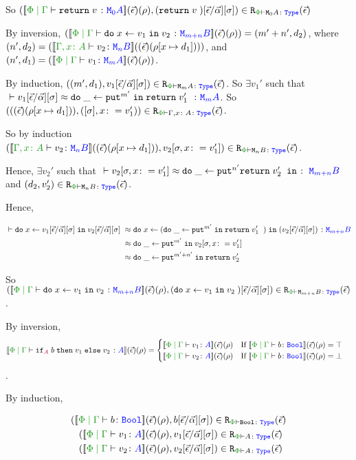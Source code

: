 \documentclass{Report}
\begin{document}
So $\inLogRelPE{\deno{\gpetyperelation{\return{v}}{\M{0}{A}}}\fundRho}{(\return{v})\fundSub}{\M{0}{A}}$

\case{\vbind}

By inversion, $(\deno{\gpetyperelation{\doin{x}{v_1}{v_2}}{\M{m+n}{B}}}\fundRho) = (m'+n', d_2)$, where $(n', d_2) = (\deno{\typerelation{\gax}{v_2}{\mnb}}(\fundRhoExt{[x\mapsto d_1]}))$, and $(n', d_1) = (\deno{\gpetyperelation{v_1}{\mma}}\fundRho)$.

By induction, $\inLogRelPE{(m', d_1)}{v_1\fundSub}{\mma}$. So $\exists v_1'$ such that $\zberelation{v_1\fundSub}{\doin{\_}{\put^{m'}}{\return{v_1'}}}{\mma}$. So $\inLogRelPE{(\fundRhoExt{[x\mapsto d_1]})}{(\ssi, x\setto v_1')}{\gax}$.

So by induction $\inLogRelPE{\deno{\typerelation{\gax}{v_2}{\mnb}}(\fundRhoExt{[x\mapsto d_1]})}{v_2\sub{\si, x\setto v_1'}}{\mnb}$.

Hence, $\exists v_2'$ such that $\zberelation{v_2\sub{\si, x\setto v_1'}}{\doin{\_}{\put^{n'}{\return{v_2'}}}}{\M{m + n}{B}}$ and $\inLogRelPE{d_2}{v_2'}{\mnb}$.

Hence,

\begin{align*}
    \zberelation{\doin{x}{v_1\fundSub}{v_2\fundSub}&}{\doin{x}{(\doin{\_}{\put^{m'}}{\return{v_1'}})}{(v_2\fundSub)}}{\M{m+n}{B}}\\
    &\beequiv\doin{\_}{\put^{m'}}{v_2\sub{\si, x\setto{v_1'}}}\\
    &\beequiv\doin{\_}{\put^{m'+n'}}{\return{v_2'}}
\end{align*}

So $\inLogRelPE{\deno{\gpetyperelation{\doin{x}{v_1}{v_2}}{\M{m+n}{B}}}\fundRho}{(\doin{x}{v_1}{v_2})\fundSub}{\M{m+n}{B}}$.



\case{\vif}

By inversion, $$\deno{\gpetyperelation{\pifthenelse{A}{b}{v_1}{v_2}}{A}}\fundRho = \begin{cases}
    \deno{\gpetyperelation{v_1}{A}}\fundRho \qt{If }\deno{\gpetyperelation{b}{\B}}\fundRho = \top\\
    \deno{\gpetyperelation{v_2}{A}}\fundRho \qt{If }\deno{\gpetyperelation{b}{\B}}\fundRho = \bot
\end{cases}
$$.

By induction,

\begin{align*}
    \inLogRelPE{\deno{\gpetyperelation{b}{\B}&}\fundRho}{b\fundSub}{\B}\\
    \inLogRelPE{\deno{\gpetyperelation{v_1}{A}&}\fundRho}{v_1\fundSub}{A}\\
    \inLogRelPE{\deno{\gpetyperelation{v_2}{A}&}\fundRho}{v_2\fundSub}{A}
\end{align*}
\end{document}
